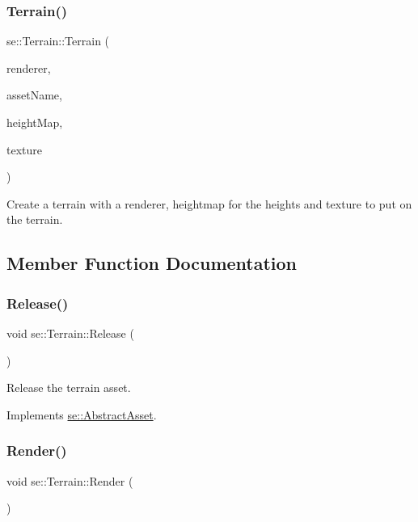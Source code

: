 \subsubsection{\texorpdfstring{Terrain()}{Terrain()}}
{\footnotesize\ttfamily se\+::\+Terrain\+::\+Terrain (\begin{DoxyParamCaption}\item[{\mbox{\hyperlink{classse_1_1_abstract_renderer}{Abstract\+Renderer}} $\ast$}]{renderer,  }\item[{const std\+::string \&}]{asset\+Name,  }\item[{const std\+::string \&}]{height\+Map,  }\item[{const std\+::string \&}]{texture }\end{DoxyParamCaption})}

Create a terrain with a renderer, heightmap for the heights and texture to put on the terrain. 

\subsection{Member Function Documentation}
\mbox{\label{classse_1_1_terrain_aab4ebd41c3ae26b258928d8f2454ed88}} 
\subsubsection{\texorpdfstring{Release()}{Release()}}
{\footnotesize\ttfamily void se\+::\+Terrain\+::\+Release (\begin{DoxyParamCaption}{ }\end{DoxyParamCaption})\hspace{0.3cm}{\ttfamily [virtual]}}

Release the terrain asset. 

Implements \mbox{\hyperlink{classse_1_1_abstract_asset_aea97e36f647efdb07a801b6fc468388d}{se\+::\+Abstract\+Asset}}.

\mbox{\label{classse_1_1_terrain_a0fcef77b6b1d8e32ce49a396d4d733e2}} 
\subsubsection{\texorpdfstring{Render()}{Render()}}
{\footnotesize\ttfamily void se\+::\+Terrain\+::\+Render (\begin{DoxyParamCaption}{ }\end{DoxyParamCaption})\hspace{0.3cm}{\ttfamily [virtual]}}

